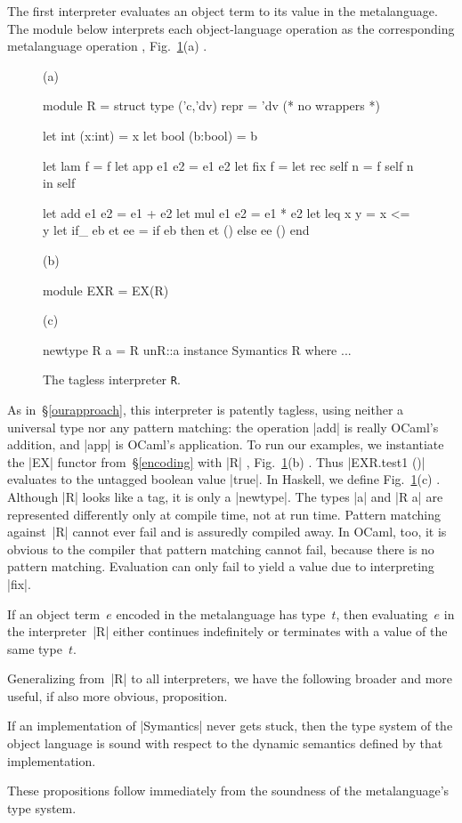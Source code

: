 The first interpreter evaluates an object term to its value in the
metalanguage.  The module below interprets each object\hyp language
operation as the corresponding metalanguage operation%
, Fig.~\ref{fig:interpreter-R}(a)
.
%
\begin{figure}
%
(a)\vspace{-10pt}
\begin{code}
module R = struct
  type ('c,'dv) repr = 'dv (* no wrappers *)

  let int  (x:int)  = x
  let bool (b:bool) = b

  let lam  f        = f
  let app  e1 e2    = e1 e2
  let fix  f        = let rec self n = f self n in self

  let add  e1 e2    = e1 + e2
  let mul  e1 e2    = e1 * e2
  let leq  x y      = x <= y
  let if_  eb et ee = if eb then et () else ee ()
end
\end{code}
%
(b)\vspace{-10pt}
\begin{code}
module EXR = EX(R)
\end{code}
%
(c)\vspace{-10pt}
\begin{code}
newtype R a = R {unR::a}
instance Symantics R where ...
\end{code}
%
\caption{The tagless interpreter \texttt{R}.}
\label{fig:interpreter-R}
\end{figure}
%
%
As in~\S\ref{ourapproach},
this interpreter is patently tagless, using neither a universal type nor
any pattern matching: the operation |add| is really
OCaml's addition, and |app| is OCaml's application. To run our
examples, we instantiate the |EX| functor from~\S\ref{encoding} with |R|%
, Fig.~\ref{fig:interpreter-R}(b)
.
Thus |EXR.test1 ()| evaluates to the untagged boolean value |true|.
In Haskell, we define
 Fig.~\ref{fig:interpreter-R}(c)
.
Although |R| looks like a tag, it is only
a |newtype|.  The types |a| and |R a| are represented differently
only at compile time, not at run time.  Pattern matching against~|R|
cannot ever fail and is assuredly compiled away.
In OCaml, too, it is obvious to the compiler that
pattern matching cannot fail, because there is no
pattern matching. Evaluation can only fail to yield a value
due to interpreting |fix|.
\begin{proposition}
If an object term~$e$ encoded in the metalanguage has type~$t$,
then evaluating~$e$ in the interpreter~|R| either continues
indefinitely or terminates with a value of the same type~$t$.
\end{proposition}
Generalizing from~|R| to all interpreters, we have the following
broader and more useful, if also more obvious, proposition.
\begin{proposition}
  If an implementation of |Symantics| never gets stuck, then
  the type system of the object
  language is sound with respect to the dynamic semantics defined by
  that implementation.
\end{proposition}
These propositions follow immediately from the soundness of the
metalanguage's type system.

